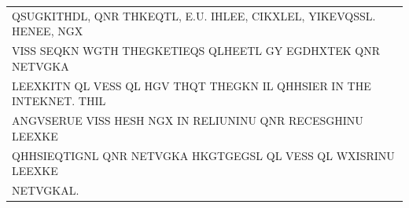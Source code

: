 \documentclass[aspectratio=169, lualatex, handout, 10pt,dvipsnames,svgnames]{beamer} %
\def\enbleu#1{\textcolor{bleu}{#1}}
\begin{document}
\begin{frame}
{\begin{tabular}[t]{l}
      QSUGK\enbleu{I}\enbleu{T}\enbleu{H}DL, Q\enbleu{N}R \enbleu{T}\enbleu{H}K\enbleu{E}Q\enbleu{T}L, \enbleu{E}.U. \enbleu{I}HL\enbleu{E}E, C\enbleu{I}KXL\enbleu{E}L, Y\enbleu{I}K\enbleu{E}VQSSL. \enbleu{H}\enbleu{E}\enbleu{N}E\enbleu{E}, NGX \\
      V\enbleu{I}SS S\enbleu{E}QK\enbleu{N} WG\enbleu{T}\enbleu{H} \enbleu{T}\enbleu{H}\enbleu{E}GK\enbleu{E}\enbleu{T}\enbleu{I}EQS QLH\enbleu{E}E\enbleu{T}L GY EGDHX\enbleu{T}\enbleu{E}K Q\enbleu{N}R \enbleu{N}\enbleu{E}\enbleu{T}VGKA \\
      L\enbleu{E}EXK\enbleu{I}\enbleu{T}N QL V\enbleu{E}SS QL \enbleu{H}GV \enbleu{T}\enbleu{H}Q\enbleu{T} \enbleu{T}\enbleu{H}\enbleu{E}GKN \enbleu{I}L QHHS\enbleu{I}\enbleu{E}R \enbleu{I}\enbleu{N} \enbleu{T}\enbleu{H}\enbleu{E} \enbleu{I}\enbleu{N}\enbleu{T}\enbleu{E}K\enbleu{N}\enbleu{E}\enbleu{T}. \enbleu{T}\enbleu{H}\enbleu{I}L \\
      A\enbleu{N}GVS\enbleu{E}RU\enbleu{E} V\enbleu{I}SS \enbleu{H}\enbleu{E}SH NGX \enbleu{I}\enbleu{N} R\enbleu{E}L\enbleu{I}U\enbleu{N}\enbleu{I}\enbleu{N}U Q\enbleu{N}R R\enbleu{E}C\enbleu{E}SGH\enbleu{I}\enbleu{N}U L\enbleu{E}EXK\enbleu{E} \\
      QHHS\enbleu{I}EQ\enbleu{T}\enbleu{I}G\enbleu{N}L Q\enbleu{N}R \enbleu{N}\enbleu{E}\enbleu{T}VGKA HKG\enbleu{T}GEGSL QL V\enbleu{E}SS QL WX\enbleu{I}SR\enbleu{I}\enbleu{N}U L\enbleu{E}EXK\enbleu{E} \\
      \enbleu{N}\enbleu{E}\enbleu{T}VGKAL.
    \end{tabular}
  }
  \vspace{0.5cm}

  \normalsize
  \color{black}{Most common digrams in c: of $>$ zi $>$ \dots}
  
  \color{black}
\end{frame}
\end{document}
